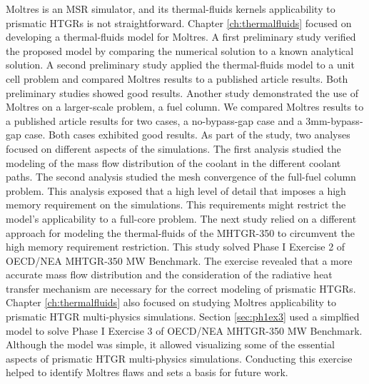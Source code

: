 Moltres is an MSR simulator, and its thermal-fluids kernels applicability to prismatic HTGRs is not straightforward.
Chapter \ref{ch:thermalfluids} focused on developing a thermal-fluids model for Moltres.
A first preliminary study verified the proposed model by comparing the numerical solution to a known analytical solution.
A second preliminary study applied the thermal-fluids model to a unit cell problem and compared Moltres results to a published article results.
Both preliminary studies showed good results.
Another study demonstrated the use of Moltres on a larger-scale problem, a fuel column.
We compared Moltres results to a published article results for two cases, a no-bypass-gap case and a 3mm-bypass-gap case.
Both cases exhibited good results.
As part of the study, two analyses focused on different aspects of the simulations.
The first analysis studied the modeling of the mass flow distribution of the coolant in the different coolant paths.
The second analysis studied the mesh convergence of the full-fuel column problem.
This analysis exposed that a high level of detail that imposes a high memory requirement on the simulations.
This requirements might restrict the model's applicability to a full-core problem.
The next study relied on a different approach for modeling the thermal-fluids of the MHTGR-350 to circumvent the high memory requirement restriction.
This study solved Phase I Exercise 2 of OECD/NEA MHTGR-350 MW Benchmark.
The exercise revealed that a more accurate mass flow distribution and the consideration of the radiative heat transfer mechanism are necessary for the correct modeling of prismatic HTGRs.
Chapter \ref{ch:thermalfluids} also focused on studying Moltres applicability to prismatic HTGR multi-physics simulations.
Section \ref{sec:ph1ex3} used a simplfied model to solve Phase I Exercise 3 of OECD/NEA MHTGR-350 MW Benchmark.
Although the model was simple, it allowed visualizing some of the essential aspects of prismatic HTGR multi-physics simulations.
Conducting this exercise helped to identify Moltres flaws and sets a basis for future work.


